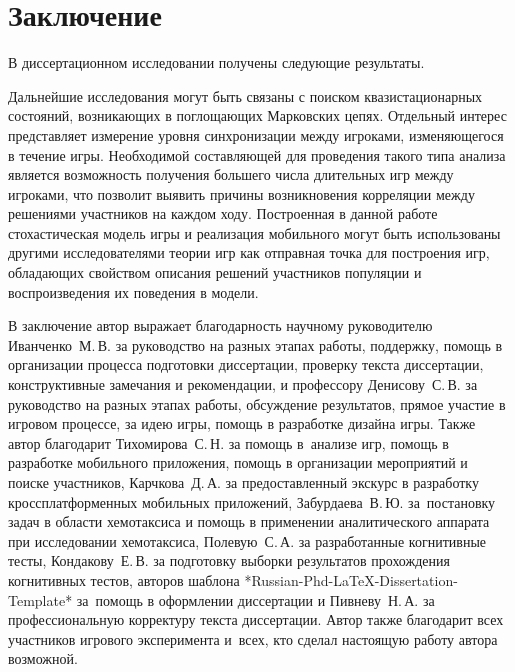 \chapter*{Заключение}                       %


В диссертационном исследовании получены следующие результаты.


Дальнейшие исследования могут быть связаны с поиском квазистационарных состояний, возникающих в поглощающих Марковских цепях. Отдельный интерес представляет измерение уровня синхронизации между игроками, изменяющегося в течение игры. Необходимой составляющей для проведения такого типа анализа является возможность получения большего числа длительных игр между игроками, что позволит выявить причины возникновения корреляции между решениями участников на каждом ходу. Построенная в данной работе стохастическая модель игры и реализация мобильного могут быть использованы другими исследователями теории игр как отправная точка для построения игр, обладающих свойством описания решений участников популяции и воспроизведения их поведения в модели. 

В заключение автор выражает благодарность научному руководителю Иванченко~М.\,В. за руководство на разных этапах работы, поддержку, помощь в организации процесса подготовки диссертации, проверку текста диссертации, конструктивные замечания и рекомендации, и профессору Денисову~С.\,В. за руководство на разных этапах работы, обсуждение результатов, прямое участие в игровом процессе, за идею игры, помощь в разработке дизайна игры. Также автор благодарит Тихомирова~С.\,Н. за помощь в~анализе игр, помощь в разработке мобильного приложения, помощь в организации мероприятий и поиске участников, Карчкова~Д.\,А. за предоставленный экскурс в разработку кроссплатформенных мобильных приложений, Забурдаева~В.\,Ю. за~постановку задач в области хемотаксиса и помощь в применении аналитического аппарата при исследовании хемотаксиса, Полевую~С.\,А. за разработанные когнитивные тесты, Кондакову~Е.\,В. за подготовку выборки результатов прохождения когнитивных тестов, авторов шаблона *Russian-Phd-LaTeX-Dissertation-Template* за~помощь в оформлении диссертации и Пивневу~Н.\,А. за профессиональную корректуру текста диссертации. Автор также благодарит всех участников игрового эксперимента и~всех, кто сделал настоящую работу автора возможной.
